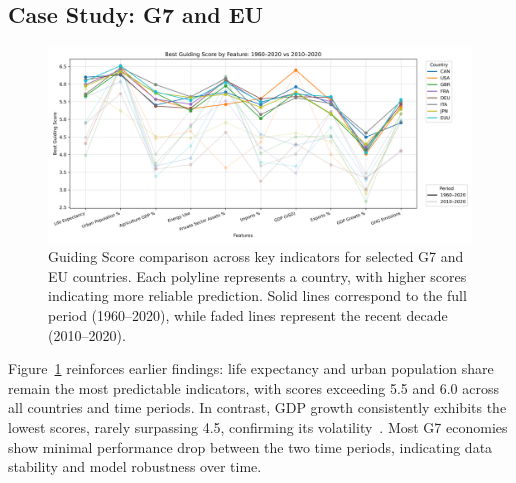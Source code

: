 \documentclass[12pt]{article}
\begin{document}
\subsection{Case Study: G7 and EU}
\begin{figure}[H]
    \centering
    \includegraphics[width=\textwidth]{comparison_feature_G7&EU.png}
\caption{Guiding Score comparison across key indicators for selected G7 and EU countries. Each polyline represents a country, with higher scores indicating more reliable prediction. Solid lines correspond to the full period (1960–2020), while faded lines represent the recent decade (2010–2020).}    
\label{fig:CaseStudyG7EU}
\end{figure}

Figure~\ref{fig:CaseStudyG7EU} reinforces earlier findings: life expectancy and 
urban population share remain the most predictable indicators, 
with scores exceeding 5.5 and 6.0 across all countries and time periods. 
In contrast, GDP growth consistently exhibits the lowest scores, 
rarely surpassing 4.5, confirming its volatility~\cite{Loungani2001}. 
Most G7 economies show minimal performance drop between the two time periods, 
indicating data stability and model robustness over time. 
\end{document}
